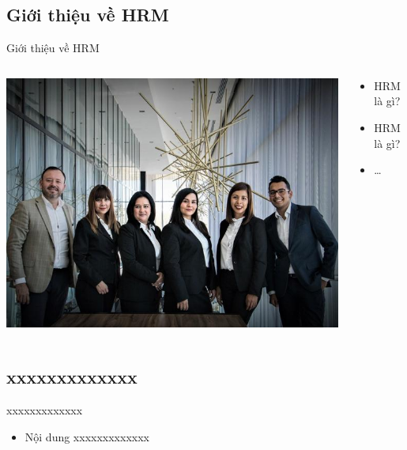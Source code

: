 \documentclass{beamer}
\begin{document}
\subsection{Giới thiệu về HRM}
\begin{frame}{Giới thiệu về HRM}
\begin{columns}

\begin{column}{0.4\textwidth}
\includegraphics[width=\textwidth]{pictures/Giới thiệu về HRM.jpg}
\end{column}

\begin{column}{0.6\textwidth}
\begin{itemize}
\item HRM là gì?
\item HRM là gì?
\item \dots
\end{itemize}

\end{column}

\end{columns}
\end{frame}

\subsection{xxxxxxxxxxxxx}
\begin{frame}{xxxxxxxxxxxxx}
\begin{itemize}
\item Nội dung xxxxxxxxxxxxx
\end{itemize}
\end{frame}
\end{document}
